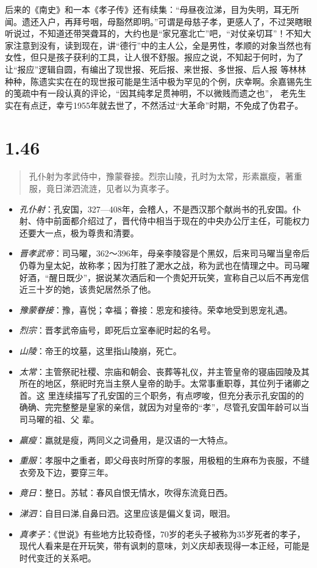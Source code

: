 \documentclass[]{book}
\providecommand{\tightlist}{%
  \setlength{\itemsep}{0pt}\setlength{\parskip}{0pt}}
\begin{document}
后来的《南史》和一本《孝子传》还有续集：``母昼夜泣涕，目为失明，耳无所闻。遗还入户，再拜号咽，母豁然即明。''可谓是母慈子孝，更感人了，不过哭瞎眼听说过，不知道还带哭聋耳的，大约也是``家兄塞北亡''吧，``对仗亲切耳''！不知大家注意到没有，读到现在，讲``德行''中的主人公，全是男性，孝顺的对象当然也有女性，但只是孩子获利的工具，让人很不舒服。报应之说，不知起于何时，为了让``报应''逻辑自圆，有编出了现世报、死后报、来世报、多世报、后人报
等林林种种，陈遗实实在在的现世报可能是生活中极为罕见的个例，庆幸啊。余嘉锡先生的笺疏中有一段认真的评论，``因其纯孝足贯神明，不以微贱而遗之也''，
老先生实在有点迂，幸亏1955年就去世了，不然活过``大革命''时期，不免成了伪君子。

\section{1.46}\label{section-45}

\begin{quote}
孔仆射为孝武侍中，豫蒙眷接。烈宗山陵，孔时为太常，形素羸瘦，著重服，竟日涕泗流涟，见者以为真孝子。
\end{quote}

\begin{itemize}
\tightlist
\item
  \emph{孔仆射}：孔安国，327---408年，会稽人，不是西汉那个献尚书的孔安国。仆射、侍中前面都介绍过了，晋代侍中相当于现在的中央办公厅主任，可能权力还要大一点，极为尊贵和清要。
\item
  \emph{晋孝武帝}：司马曜，362～396年，母亲李陵容是个黑奴，后来司马曜当皇帝后仍尊为皇太妃，故称孝；因为打胜了淝水之战，称为武也在情理之中。司马曜好酒，``醒日既少''，据说某次酒后和一个贵妃开玩笑，宣称自己以后不再宠信近三十岁的她，该贵妃居然杀了他。
\item
  \emph{豫蒙眷接}：豫，喜悦；幸福；眷接：恩宠和接待。荣幸地受到恩宠礼遇。
\item
  \emph{烈宗}：晋孝武帝庙号，即死后立室奉祀时起的名号。
\item
  \emph{山陵}：帝王的坟墓，这里指山陵崩，死亡。
\item
  \emph{太常}：主管祭祀社稷、宗庙和朝会、丧葬等礼仪，并主管皇帝的寝庙园陵及其所在的地区，祭祀时充当主祭人皇帝的助手。太常事重职尊，其位列于诸卿之首。这
  里连续描写了孔安国的三个职务，有点啰唆，但充分表示孔安国的的确确、完完整整是皇家的亲信，就因为对皇帝的``孝''，尽管孔安国年龄可以当司马曜的祖、父
  辈。
\item
  \emph{羸瘦}：羸就是瘦，两同义之词叠用，是汉语的一大特点。
\item
  \emph{重服}：孝服中之重者，即父母丧时所穿的孝服，用极粗的生麻布为丧服，不缝衣旁及下边，要穿三年。
\item
  \emph{竟日}：整日。苏轼：春风自恨无情水，吹得东流竟日西。
\item
  \emph{涕泗}：自目曰涕,自鼻曰泗。这里应该是偏义复词，眼泪。
\item
  \emph{真孝子}：《世说》有些地方比较奇怪，70岁的老头子被称为35岁死者的孝子，现代人看来是在开玩笑，带有讽刺的意味，刘义庆却表现得一本正经，可能是时代变迁的关系吧。
\end{itemize}
\end{document}
